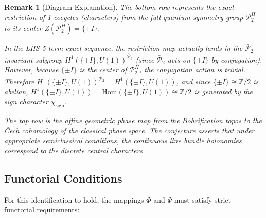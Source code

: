 \documentclass[11pt]{article}
\newtheorem{remark}[theorem]{Remark}
\begin{document}
\begin{remark}[Diagram Explanation]
The bottom row represents the exact restriction of 1-cocycles (characters) from the full quantum symmetry group $\mathcal{P}_2^H$ to its center $Z(\mathcal{P}_2^H) = \{\pm I\}$.

In the LHS 5-term exact sequence, the restriction map actually lands in the $\bar{\mathcal{P}}_2$-invariant subgroup $H^1(\{\pm I\}, U(1))^{\bar{\mathcal{P}}_2}$ (since $\bar{\mathcal{P}}_2$ acts on $\{\pm I\}$ by conjugation). However, because $\{\pm I\}$ is the center of $\mathcal{P}_2^H$, the conjugation action is trivial. Therefore $H^1(\{\pm I\}, U(1))^{\bar{\mathcal{P}}_2} = H^1(\{\pm I\}, U(1))$, and since $\{\pm I\} \cong \mathbb{Z}/2$ is abelian, $H^1(\{\pm I\}, U(1)) = \mathrm{Hom}(\{\pm I\}, U(1)) \cong \mathbb{Z}/2$ is generated by the sign character $\chi_{\text{sign}}$.

The top row is the affine geometric phase map from the Bohrification topos to the \v{C}ech cohomology of the classical phase space. The conjecture asserts that under appropriate semiclassical conditions, the continuous line bundle holonomies correspond to the discrete central characters.
\end{remark}

\subsection{Functorial Conditions}

For this identification to hold, the mappings $\Phi$ and $\Psi$ must satisfy strict functorial requirements:
\end{document}
